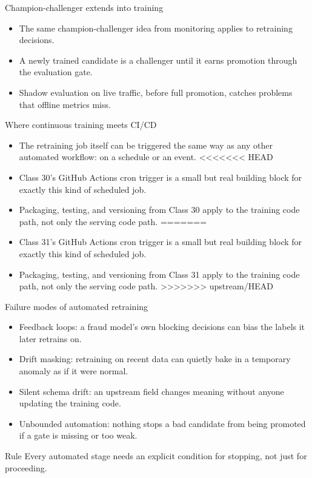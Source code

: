 \begin{frame}{Champion-challenger extends into training}
\begin{itemize}
\item The same champion-challenger idea from monitoring applies to retraining decisions.
\item A newly trained candidate is a challenger until it earns promotion through the evaluation gate.
\item Shadow evaluation on live traffic, before full promotion, catches problems that offline metrics miss.
\end{itemize}
\coursefooter
\end{frame}

\begin{frame}{Where continuous training meets CI/CD}
\begin{itemize}
\item The retraining job itself can be triggered the same way as any other automated workflow: on a schedule or an event.
<<<<<<< HEAD
\item Class 30's GitHub Actions cron trigger is a small but real building block for exactly this kind of scheduled job.
\item Packaging, testing, and versioning from Class 30 apply to the training code path, not only the serving code path.
=======
\item Class 31's GitHub Actions cron trigger is a small but real building block for exactly this kind of scheduled job.
\item Packaging, testing, and versioning from Class 31 apply to the training code path, not only the serving code path.
>>>>>>> upstream/HEAD
\end{itemize}
\coursefooter
\end{frame}

\begin{frame}{Failure modes of automated retraining}
\begin{itemize}
\item Feedback loops: a fraud model's own blocking decisions can bias the labels it later retrains on.
\item Drift masking: retraining on recent data can quietly bake in a temporary anomaly as if it were normal.
\item Silent schema drift: an upstream field changes meaning without anyone updating the training code.
\item Unbounded automation: nothing stops a bad candidate from being promoted if a gate is missing or too weak.
\end{itemize}
\begin{block}{Rule}
Every automated stage needs an explicit condition for stopping, not just for proceeding.
\end{block}
\coursefooter
\end{frame}

